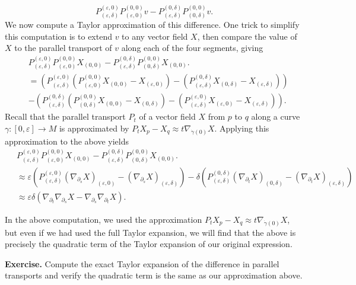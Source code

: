 \documentclass[
]{article}
\begin{document}
\[
    P_{(\varepsilon,\delta)}^{(\varepsilon,0)} P_{(\varepsilon,0)}^{(0,0)} v - P_{(\varepsilon,\delta)}^{(0,\delta)} P_{(0,\delta)}^{(0,0)} v.
\] We now compute a Taylor approximation of this difference. One trick
to simplify this computation is to extend \(v\) to any vector field
\(X\), then compare the value of \(X\) to the parallel transport of
\(v\) along each of the four segments, giving \begin{align}
    &P_{(\varepsilon,\delta)}^{(\varepsilon,0)} P_{(\varepsilon,0)}^{(0,0)} X_{(0,0)} - P_{(\varepsilon,\delta)}^{(0,\delta)} P_{(0,\delta)}^{(0,0)} X_{(0,0)}.\\\
    &= (P_{(\varepsilon,\delta)}^{(\varepsilon,0)}(P_{(\varepsilon,0)}^{(0,0)}X_{(0,0)} - X_{(\varepsilon,0)})
    - (P_{(\varepsilon,\delta)}^{(0,\delta)}X_{(0,\delta)} - X_{(\varepsilon,\delta)}))\\\
    &- (P_{(\varepsilon,\delta)}^{(0,\delta)}(P_{(0,\delta)}^{(0,0)}X_{(0,0)} - X_{(0,\delta)})
    - (P_{(\varepsilon,\delta)}^{(\varepsilon,0)}X_{(\varepsilon,0)} - X_{(\varepsilon,\delta)})).
\end{align} Recall that the parallel transport \(P_t\) of a vector field
\(X\) from \(p\) to \(q\) along a curve
\(\gamma: [0, \varepsilon] \to M\) is approximated by
\(P_t X_p - X_q \approx t \nabla_{\dot{\gamma}(0)}X\). Applying this
approximation to the above yields \begin{align}
    &P_{(\varepsilon,\delta)}^{(\varepsilon,0)} P_{(\varepsilon,0)}^{(0,0)} X_{(0,0)} - P_{(\varepsilon,\delta)}^{(0,\delta)} P_{(0,\delta)}^{(0,0)} X_{(0,0)}.\\\
    &\approx \varepsilon(P_{(\varepsilon,\delta)}^{(\varepsilon,0)}(\nabla_{\partial_s}X)_{(\varepsilon, 0)}
    - (\nabla_{\partial_s}X)_{(\varepsilon, \delta)})
    - \delta(P_{(\varepsilon,\delta)}^{(0, \delta)}(\nabla_{\partial_t}X)_{(0, \delta)}
    - (\nabla_{\partial_t}X)_{(\varepsilon, \delta)})\\\
    &\approx \varepsilon\delta (\nabla_{\partial_t}\nabla_{\partial_s} X - \nabla_{\partial_s}\nabla_{\partial_t} X).
\end{align}

In the above computation, we used the approximation
\(P_t X_p - X_q \approx t \nabla_{\dot{\gamma}(0)}X\), but even if we
had used the full Taylor expansion, we will find that the above is
precisely the quadratic term of the Taylor expansion of our original
expression.

\textbf{Exercise.} Compute the exact Taylor expansion of the difference
in parallel transports and verify the quadratic term is the same as our
approximation above.
\end{document}

